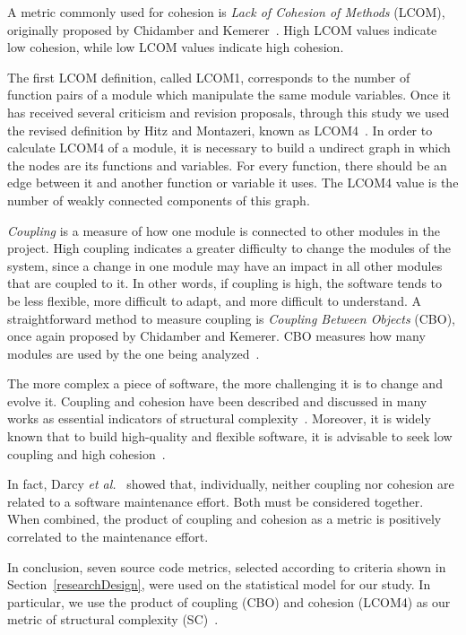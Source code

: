 \documentclass[conference]{IEEEtran}
\begin{document}
%
A metric commonly used for cohesion is \emph{Lack of Cohesion of
Methods} (LCOM), originally proposed by Chidamber and Kemerer~\cite{Chidamber94}.
High LCOM values indicate low cohesion, while low LCOM values indicate high cohesion.

The first LCOM definition, called LCOM1, corresponds to
the number of function pairs of a module which manipulate the same module variables.
Once it has received several criticism and revision proposals, through this study we used 
the revised definition by Hitz and Montazeri, known as LCOM4~\cite{LCOM4}.
%
In order to calculate LCOM4 of a module, it is necessary to build a undirect graph in
which the nodes are its functions and variables. For every function, there should be
an edge between it and another function or variable it uses. The LCOM4 value is the number
of weakly connected components of this graph.

\emph{Coupling} is a measure of how one module is connected to other modules
in the project.
%
High coupling indicates a greater difficulty to change the
modules of the system, since a change in one module may have an impact in
all other modules that are coupled to it.
%
In other words, if coupling is high, the software tends to be less flexible,
more difficult to adapt, and more difficult to understand.
%
A straightforward method to measure coupling is \emph{Coupling Between Objects} (CBO),
once again proposed by Chidamber and Kemerer. CBO measures how many modules are
used by the one being analyzed~\cite{Chidamber94}.

The more complex a piece of software, the more challenging it is to change and
evolve it. Coupling and cohesion have been described and discussed in
many works as essential indicators of structural complexity~\cite{darcy2005}.
Moreover, it is widely known that to build high-quality and flexible software, 
it is advisable to seek low coupling and high cohesion~\cite{richter99}.

In fact, Darcy \emph{et al.}~\cite{darcy2005} showed that, individually, neither
coupling nor cohesion are related to a software maintenance effort. Both must be considered together.
When combined, the product of coupling and cohesion as a metric is positively correlated to
the maintenance effort.

In conclusion, seven source code metrics, selected according to criteria shown 
in Section~\ref{researchDesign}, were used on the statistical model for our study.
%
In particular, we use the product of coupling (CBO) and cohesion (LCOM4) as
our metric of structural complexity (SC)~\cite{darcy2005}.
\end{document}
